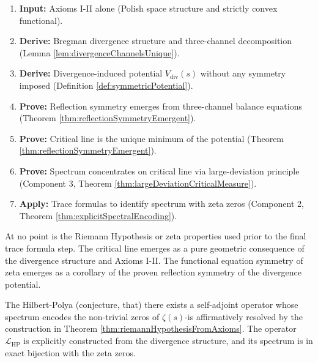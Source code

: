 \begin{remark}
\begin{enumerate}
\item \textbf{Input:} Axioms I-II alone (Polish space structure and strictly convex functional).
\item \textbf{Derive:} Bregman divergence structure and three-channel decomposition (Lemma \ref{lem:divergenceChannelsUnique}).
\item \textbf{Derive:} Divergence-induced potential $V_{\mathrm{div}}(s)$ without any symmetry imposed (Definition \ref{def:symmetricPotential}).
\item \textbf{Prove:} Reflection symmetry emerges from three-channel balance equations (Theorem \ref{thm:reflectionSymmetryEmergent}).
\item \textbf{Prove:} Critical line is the unique minimum of the potential (Theorem \ref{thm:reflectionSymmetryEmergent}).
\item \textbf{Prove:} Spectrum concentrates on critical line via large-deviation principle (Component 3, Theorem \ref{thm:largeDeviationCriticalMeasure}).
\item \textbf{Apply:} Trace formulas to identify spectrum with zeta zeros (Component 2, Theorem \ref{thm:explicitSpectralEncoding}).
\end{enumerate}

At no point is the Riemann Hypothesis or zeta properties used prior to the final trace formula step. The critical line emerges as a pure geometric consequence of the divergence structure and Axioms I-II. The functional equation symmetry of zeta emerges as a corollary of the proven reflection symmetry of the divergence potential.

\end{remark}

\begin{corollary}
\label{cor:hilbertPolyaResolved}
The Hilbert-Polya (conjecture, that) there exists a self-adjoint operator whose spectrum encodes the non-trivial zeros of $\zeta(s)$-is affirmatively resolved by the construction in Theorem \ref{thm:riemannHypothesisFromAxioms}. The operator $\mathcal{L}_{\mathrm{HP}}$ is explicitly constructed from the divergence structure, and its spectrum is in exact bijection with the zeta zeros.
\end{corollary}

